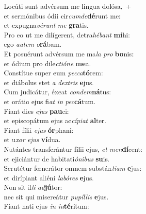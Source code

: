 \evenverse Locúti sunt advérsum me lingua dolósa,~+\\\evenverse  et sermónibus ódii cir\textit{cum}\textit{de}\textbf{dé}runt me:~\*\\
\evenverse et expugna\textit{vé}\textit{runt} \textit{me} \textbf{gra}tis.\\
\oddverse Pro eo ut me dilígerent, detra\textit{hé}\textit{bant} \textbf{mi}hi:~\*\\
\oddverse ego \textit{au}\textit{tem} \textit{o}\textbf{rá}bam.\\
\evenverse Et posuérunt advérsum me ma\textit{la} \textit{pro} \textbf{bo}nis:~\*\\
\evenverse et ódium pro dile\textit{cti}\textit{ó}\textit{ne} \textbf{me}a.\\
\oddverse Constítue super eum \textit{pec}\textit{ca}\textbf{tó}rem:~\*\\
\oddverse et diábolus stet \textit{a} \textit{dex}\textit{tris} \textbf{e}jus.\\
\evenverse Cum judicátur, éxeat \textit{con}\textit{dem}\textbf{ná}tus:~\*\\
\evenverse et orátio ejus fi\textit{at} \textit{in} \textit{pec}\textbf{cá}tum.\\
\oddverse Fiant dies \textit{e}\textit{jus} \textbf{pau}ci:~\*\\
\oddverse et episcopátum ejus ac\textit{cí}\textit{pi}\textit{at} \textbf{al}ter.\\
\evenverse Fiant fílii \textit{e}\textit{jus} \textbf{ór}phani:~\*\\
\evenverse et u\textit{xor} \textit{e}\textit{jus} \textbf{ví}dua.\\
\oddverse Nutántes transferántur fílii ejus, \textit{et} \textit{men}\textbf{dí}cent:~\*\\
\oddverse et ejiciántur de habitati\textit{ó}\textit{ni}\textit{bus} \textbf{su}is.\\
\evenverse Scrutétur fœnerátor omnem substán\textit{ti}\textit{am} \textbf{e}jus:~\*\\
\evenverse et dirípiant aliéni \textit{la}\textit{bó}\textit{res} \textbf{e}jus.\\
\oddverse Non sit il\textit{li} \textit{ad}\textbf{jú}tor:~\*\\
\oddverse nec sit qui misereátur \textit{pu}\textit{píl}\textit{lis} \textbf{e}jus.\\
\evenverse Fiant nati ejus \textit{in} \textit{in}\textbf{té}ritum:~\*\\
